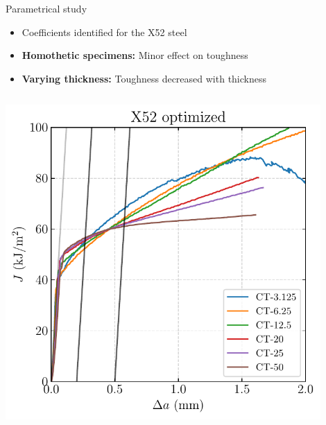 \documentclass[9pt]{beamer}
\begin{document}

\begin{frame}{Parametrical study}

    \begin{itemize}
    	\item Coefficients identified for the X52 steel
    	\vspace{0.2cm}
        \item \textbf{Homothetic specimens:} Minor effect on toughness
        \vspace{0.2cm}
        \item \textbf{Varying thickness:} Toughness decreased with thickness
    \end{itemize}

    \vspace{0.15cm}

    \begin{columns}
        \centering
        \includegraphics[width=0.9\textwidth]{Images/plot_homo_Jda_1_2__1_4.pdf}
        

\end{columns}
\end{frame}
\end{document}
